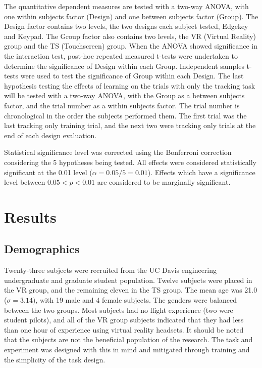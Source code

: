 The quantitative dependent measures are tested with a two-way ANOVA, with one within subjects factor (Design) and one between subjects factor (Group).
The Design factor contains two levels, the two designs each subject tested, Edgekey and Keypad.
The Group factor also contains two levels, the VR (Virtual Reality) group and the TS (Touchscreen) group.
When the ANOVA showed significance in the interaction test, post-hoc repeated measured t-tests were undertaken to determine the significance of Design within each Group.
Independent samples t-tests were used to test the significance of Group within each Design.
The last hypothesis testing the effects of learning on the trials with only the tracking task will be tested with a two-way ANOVA, with the Group as a between subjects factor, and the trial number as a within subjects factor.
The trial number is chronological in the order the subjects performed them.
The first trial was the last tracking only training trial, and the next two were tracking only trials at the end of each design evaluation.

Statistical significance level was corrected using the Bonferroni correction considering the 5 hypotheses being tested.
All effects were considered statistically significant at the 0.01 level ($\alpha = 0.05/5 = 0.01$).
Effects which have a significance level between $0.05<p<0.01$ are considered to be marginally significant.

\section{Results}

\subsection{Demographics}

Twenty-three subjects were recruited from the UC Davis engineering undergraduate and graduate student population.
Twelve subjects were placed in the VR group, and the remaining eleven in the TS group.
The mean age was 21.0 ($\sigma = 3.14)$, with 19 male and 4 female subjects.
The genders were balanced between the two groups.
Most subjects had no flight experience (two were student pilots), and all of the VR group subjects indicated that they had less than one hour of experience using virtual reality headsets.
It should be noted that the subjects are not the beneficial population of the research.
The task and experiment was designed with this in mind and mitigated through training and the simplicity of the task design.

